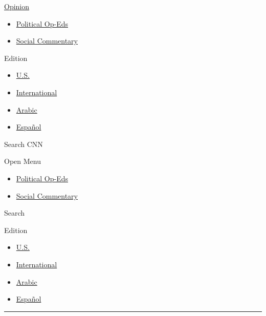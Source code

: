 \href{/opinions}{Opinion}

\begin{itemize}
\tightlist
\item
  \href{/specials/opinion/opinion-politics}{Political Op-Eds}
\item
  \href{/specials/opinion/opinion-social-issues}{Social Commentary}
\end{itemize}

Edition

\begin{itemize}
\tightlist
\item
  \href{//us.cnn.com?hpt=header_edition-picker}{U.S.}
\item
  \href{//edition.cnn.com?hpt=header_edition-picker}{International}
\item
  \href{//arabic.cnn.com?hpt=header_edition-picker}{Arabic}
\item
  \href{//cnnespanol.cnn.com?hpt=header_edition-picker}{Español}
\end{itemize}

Search CNN

Open Menu

\begin{itemize}
\tightlist
\item
  \href{/specials/opinion/opinion-politics}{Political Op-Eds}
\item
  \href{/specials/opinion/opinion-social-issues}{Social Commentary}
\end{itemize}

Search

Edition

\begin{itemize}
\tightlist
\item
  \href{//us.cnn.com?hpt=header_edition-picker}{U.S.}
\item
  \href{//edition.cnn.com?hpt=header_edition-picker}{International}
\item
  \href{//arabic.cnn.com?hpt=header_edition-picker}{Arabic}
\item
  \href{//cnnespanol.cnn.com?hpt=header_edition-picker}{Español}
\end{itemize}

\begin{center}\rule{0.5\linewidth}{\linethickness}\end{center}

